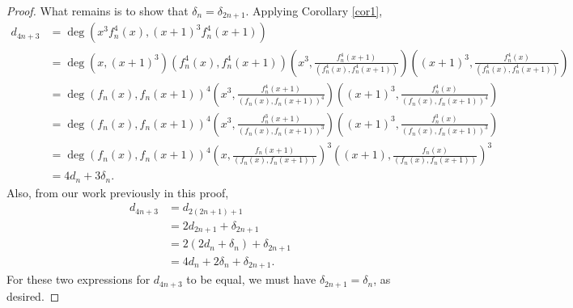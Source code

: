 \documentclass[a4paper]{article}
\begin{document}
\begin{proof}
		What remains is to show that $\delta_{n} = \delta_{2n+1}$.
		Applying Corollary \ref{cor1},
		\begin{align*}
			d_{4n+3} &= \deg\left(x^3f^4_n(x), (x+1)^3f^4_n(x+1)\right) \\
				&= \deg\left(x,(x+1)^3\right)\left(f^4_n(x),f^4_n(x+1)\right)\left(x^3,\frac{f^4_n(x+1)}{(f^4_n(x),f^4_n(x+1))}\right)\left((x+1)^3,\frac{f^4_n(x)}{(f^4_n(x),f^4_n(x+1))}\right) \\
				&= \deg\left(f_n(x),f_n(x+1)\right)^4\left(x^3,\frac{f^4_n(x+1)}{(f_n(x),f_n(x+1))^4}\right)\left((x+1)^3,\frac{f^4_n(x)}{(f_n(x),f_n(x+1))^4}\right) \\
				&= \deg\left(f_n(x),f_n(x+1)\right)^4\left(x^3,\frac{f^3_n(x+1)}{(f_n(x),f_n(x+1))^3}\right)\left((x+1)^3,\frac{f^3_n(x)}{(f_n(x),f_n(x+1))^3}\right) \\
				&= \deg\left(f_n(x),f_n(x+1)\right)^4\left(x,\frac{f_n(x+1)}{(f_n(x),f_n(x+1))}\right)^3\left((x+1),\frac{f_n(x)}{(f_n(x),f_n(x+1))}\right)^3 \\
				&= 4d_n + 3\delta_n.
		\end{align*}
		Also, from our work previously in this proof,
		\begin{align*}
			d_{4n+3} &= d_{2(2n+1) + 1} \\
				&= 2 d_{2n+1} + \delta_{2n+1} \\
				&= 2 \left(2d_{n} + \delta_{n}\right) + \delta_{2n+1} \\
				&= 4d_{n} + 2\delta_{n} + \delta_{2n+1}.
		\end{align*}
		For these two expressions for $d_{4n+3}$ to be equal, we must have $\delta_{2n+1} = \delta_n$, as desired.
	\end{proof}
	
	\newpage
	
	
\end{document}
